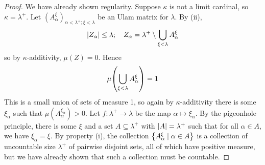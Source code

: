 \begin{proof}
    We have already shown regularity.
    Suppose \( \kappa \) is not a limit cardinal, so \( \kappa = \lambda^+ \).
    Let \( (A_\alpha^\xi)_{\alpha < \lambda^+; \xi < \lambda} \) be an Ulam matrix for \( \lambda \).
    By (ii),
    \[ \abs{Z_\alpha} \leq \lambda;\quad Z_\alpha = \lambda^+ \setminus \bigcup_{\xi < \lambda} A_\alpha^\xi \]
    so by \( \kappa \)-additivity, \( \mu(Z) = 0 \).
    Hence
    \[ \mu\qty(\bigcup_{\xi < \lambda} A_\alpha^\xi) = 1 \]
    This is a small union of sets of measure 1, so again by \( \kappa \)-additivity there is some \( \xi_\alpha \) such that \( \mu(A_\alpha^{\xi_\alpha}) > 0 \).
    Let \( f : \lambda^+ \to \lambda \) be the map \( \alpha \mapsto \xi_\alpha \).
    By the pigeonhole principle, there is some \( \xi \) and a set \( A \subseteq \lambda^+ \) with \( \abs{A} = \lambda^+ \) such that for all \( \alpha \in A \), we have \( \xi_\alpha = \xi \).
    By property (i), the collection \( \qty{A_\alpha^\xi \mid \alpha \in A} \) is a collection of uncountable size \( \lambda^+ \) of pairwise disjoint sets, all of which have positive measure, but we have already shown that such a collection must be countable.
\end{proof}

